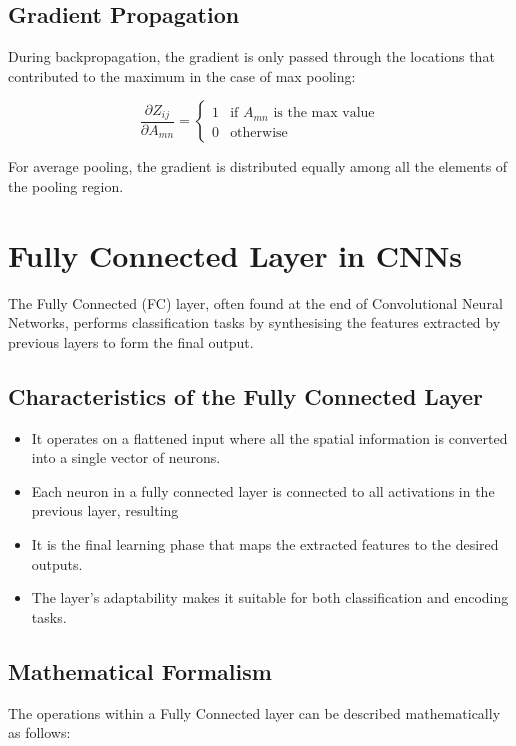 \subsection{Gradient Propagation}

During backpropagation, the gradient is only passed through the locations that contributed to the maximum in the case of max pooling:

\[
\frac{\partial Z_{ij}}{\partial A_{mn}} = 
\begin{cases} 
1 & \text{if } A_{mn} \text{ is the max value} \\
0 & \text{otherwise}
\end{cases}
\]

For average pooling, the gradient is distributed equally among all the elements of the pooling region.


\section{Fully Connected Layer in CNNs}

The Fully Connected (FC) layer, often found at the end of Convolutional Neural Networks, performs classification tasks by synthesising the features extracted by previous layers to form the final output.

\subsection*{Characteristics of the Fully Connected Layer}

\begin{itemize}
    \item It operates on a flattened input where all the spatial information is converted into a single vector of neurons.
    \item Each neuron in a fully connected layer is connected to all activations in the previous layer, resulting 
    \item It is the final learning phase that maps the extracted features to the desired outputs.
    \item The layer's adaptability makes it suitable for both classification and encoding tasks.
\end{itemize}

\subsection*{Mathematical Formalism}

The operations within a Fully Connected layer can be described mathematically as follows:\\

